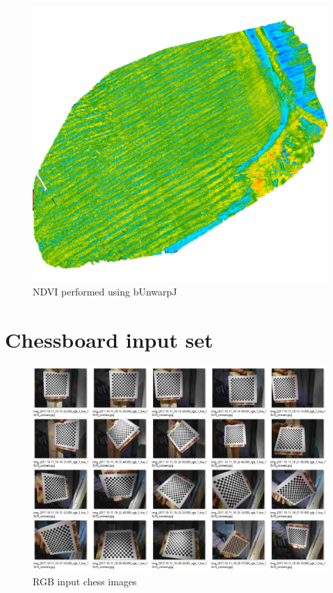 \begin{appendices}
\begin{figure}[H]
\centering
\includegraphics[scale=0.35]{images/map_ndvi_large.png}
\caption{NDVI performed using bUnwarpJ \cite{bunwarpj}}
\label{fig:app_stitch_map}
\end{figure}

\chapter{Chessboard input set}
\label{app:chess}

\begin{figure}[H]
\centering
\includegraphics[scale=0.505]{images/rgb_chess_set.JPG}
\caption{RGB input chess images}
\label{fig:rgb_input_chess}
\end{figure}


\end{appendices}
